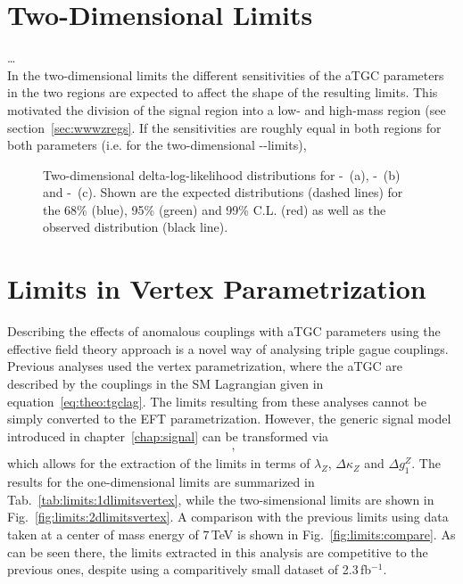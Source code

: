 \section{Two-Dimensional Limits}
\label{sec:2dlims}
\dots \\
\noindent In the two-dimensional limits the different sensitivities of the aTGC parameters in the two regions are expected to affect the shape of the resulting limits. This motivated the division of the signal region into a low- and high-mass region (see section~\ref{sec:wwwzregs}. If the sensitivities are roughly equal in both regions for both parameters (i.e. for the two-dimensional \Tcwww -\Tccw -limits), 

\begin{figure}
	\centering
	\caption[Two-dimensional delta-log-likelihood distributions for the three combinations of aTGC parameters]{Two-dimensional delta-log-likelihood distributions for \Tcwww -\Tccw \ (a), \Tcwww -\Tcb \ (b) and \Tccw -\Tcb\ (c). Shown are the expected distributions (dashed lines) for the 68\% (blue), 95\% (green) and 99\% C.L. (red) as well as the observed distribution (black line).}
	\label{fig:limits:2dlimits}	
\end{figure}

\section{Limits in Vertex Parametrization}
\label{sec:vertex}
Describing the effects of anomalous couplings with aTGC parameters using the effective field theory approach is a novel way of analysing triple gague couplings. Previous analyses used the vertex parametrization, where the aTGC are described by the couplings in the SM Lagrangian given in equation~\ref{eq:theo:tgclag}. The limits resulting from these analyses cannot be simply converted to the EFT parametrization. However, the generic signal model introduced in chapter~\ref{chap:signal} can be transformed via
\begin{align}
~,
\end{align}
which allows for the extraction of the limits in terms of $\lambda_Z$, $\Delta \kappa_Z$ and $\Delta g_1^Z$. The results for the one-dimensional limits are summarized in Tab.~\ref{tab:limits:1dlimitsvertex}, while the two-simensional limits are shown in Fig.~\ref{fig:limits:2dlimitsvertex}. A comparison with the previous limits using data taken at a center of mass energy of 7\,TeV is shown in Fig.~\ref{fig:limits:compare}. As can be seen there, the limits extracted in this analysis are competitive to the previous ones, despite using a comparitively small dataset of 2.3\,fb$^{-1}$.

